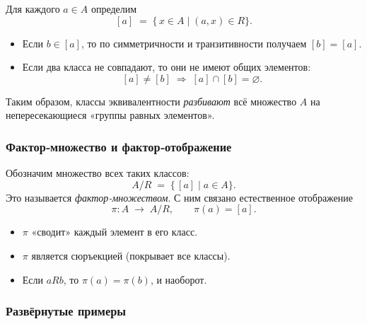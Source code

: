 Для каждого $a\in A$ определим
\[
  [a] \;=\; \{\,x\in A \mid (a,x)\in R\}.
\]
\begin{itemize}[leftmargin=*]
  \item Если $b\in[a]$, то по симметричности и транзитивности получаем $[b]=[a]$.
  \item Если два класса не совпадают, то они не имеют общих элементов:
    \[
      [a]\neq[b]\;\Longrightarrow\;[a]\cap[b]=\varnothing.
    \]
\end{itemize}

Таким образом, классы эквивалентности \emph{разбивают} всё множество $A$ на непересекающиеся «группы равных элементов».

\subsubsection{Фактор‑множество и фактор‑отображение}

Обозначим множество всех таких классов:
\[
  A/R \;=\; \{\, [a] \mid a\in A\}.
\]
Это называется \emph{фактор‑множеством}.  
С ним связано естественное отображение
\[
  \pi: A \;\longrightarrow\; A/R,\qquad
  \pi(a) = [a].
\]
\begin{itemize}[leftmargin=*]
  \item $\pi$ «сводит» каждый элемент в его класс.
  \item $\pi$ является сюръекцией (покрывает все классы).
  \item Если $aRb$, то $\pi(a)=\pi(b)$, и наоборот.
\end{itemize}

\subsubsection{Развёрнутые примеры}

